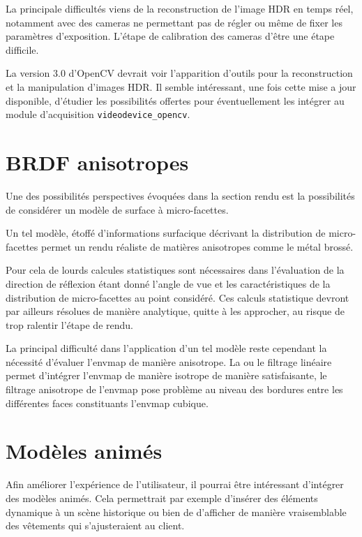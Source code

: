 \documentclass[10pt,a4paper,twoside, twocolumn]{report}
\begin{document}
La principale difficultés viens de la reconstruction de l’image HDR en temps réel, notamment avec des cameras ne permettant pas de régler ou même de fixer les paramètres d’exposition. L’étape de calibration des cameras d’être une étape difficile. 

La version $3.0$ d’OpenCV devrait voir l’apparition d’outils pour la reconstruction et la manipulation d’images HDR. Il semble intéressant, une fois cette mise a jour disponible, d’étudier les possibilités offertes pour éventuellement les intégrer au module d’acquisition \texttt{videodevice\_opencv}.


\section{BRDF anisotropes}

Une des possibilités perspectives évoquées dans la section rendu est la possibilités de considérer un modèle de surface à micro-facettes.

Un tel modèle, étoffé d’informations surfacique décrivant la distribution de micro-facettes permet un rendu réaliste de matières anisotropes comme le métal brossé.

Pour cela de lourds calcules statistiques sont nécessaires dans l’évaluation de la direction de réflexion étant donné l’angle de vue et les caractéristiques de la distribution de micro-facettes au point considéré. Ces calculs statistique devront par ailleurs résolues de manière analytique, quitte à les approcher, au risque de trop ralentir l’étape de rendu.

La principal difficulté dans l’application d’un tel modèle reste cependant la nécessité d’évaluer l’envmap de manière anisotrope. La ou le filtrage linéaire permet d’intégrer l’envmap de manière isotrope de manière satisfaisante, le filtrage anisotrope de l’envmap pose problème au niveau des bordures entre les différentes faces constituants l’envmap cubique.


\section{Modèles animés}

Afin améliorer l’expérience de l’utilisateur, il pourrai être intéressant d’intégrer des modèles animés. Cela permettrait par exemple d’insérer des éléments dynamique à un scène historique ou bien de d’afficher de manière vraisemblable des vêtements qui s’ajusteraient au client.
\end{document}
